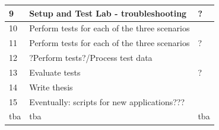 \begin{table}[ht]
\begin{tabularx}{\textwidth}{|p{1cm}|X|p{1.5cm}|}
    \hline
    9  & Setup and Test Lab - troubleshooting & ? \\
    \hline
    10  & Perform tests for each of the three scenarios & \\
    \hline
    11  & Perform tests for each of the three scenarios & ? \\
    \hline
    12  & ?Perform tests?/Process test data & \\
    \hline
    13 & Evaluate tests & ? \\
    \hline
    14 & Write thesis & \\
    \hline
    15 & Eventually: scripts for new applications??? & \\
    \hline
    tba & tba & tba \\
    \hline
    \end{tabularx}
 \end{table}